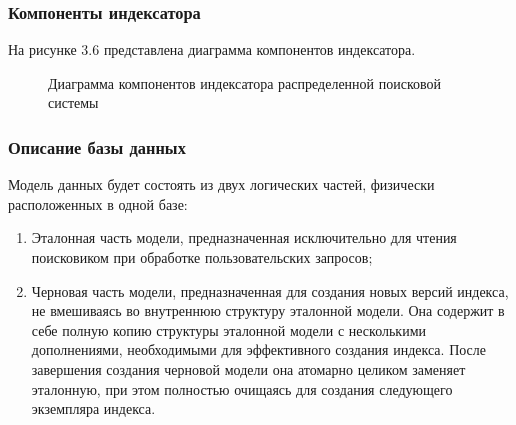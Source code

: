 \subsubsection{Компоненты индексатора}

На рисунке 3.6 представлена диаграмма компонентов индексатора.

\begin{figure}[H]
\caption{Диаграмма компонентов индексатора распределенной поисковой системы}
\label{indexer/diagram_components:image}
\end{figure}

\subsubsection{Описание базы данных}

Модель данных будет состоять из двух логических частей, физически расположенных в одной базе:
\begin{enumerate}
\item Эталонная часть модели, предназначенная исключительно для чтения поисковиком при обработке пользовательских запросов;
\item Черновая часть модели, предназначенная для создания новых версий индекса, не вмешиваясь во внутреннюю структуру эталонной модели. Она содержит в себе полную копию структуры эталонной модели с несколькими дополнениями, необходимыми для эффективного создания индекса. После завершения создания черновой модели она атомарно целиком заменяет эталонную, при этом полностью очищаясь для создания следующего экземпляра индекса.
\end{enumerate}

